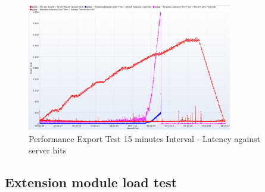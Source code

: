 \begin{figure}[htp]
    \centering
    \includegraphics[width=0.8\textwidth]{results/obs/export/obs_export_15m_res_latencies_against_hits.png}
    \caption{Performance Export Test 15 minutes Interval - Latency against server hits}
    \label{fi:test_obs_export_15m_latency}
\end{figure}



\subsection{Extension module load test}
\label{subse:obs_test_plan_extension_15min}
